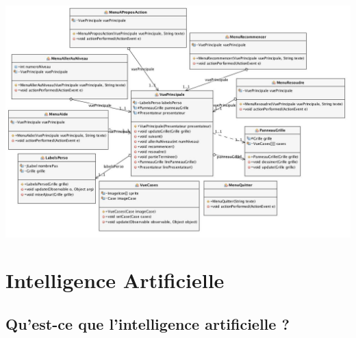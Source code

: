\documentclass[a4paper,12pt]{article} %
\begin{document}
\includegraphics[scale=0.36]{vue2.jpg}
\newpage




\section{Intelligence Artificielle}
\subsection{Qu'est-ce que l'intelligence artificielle ?}
\end{document}
